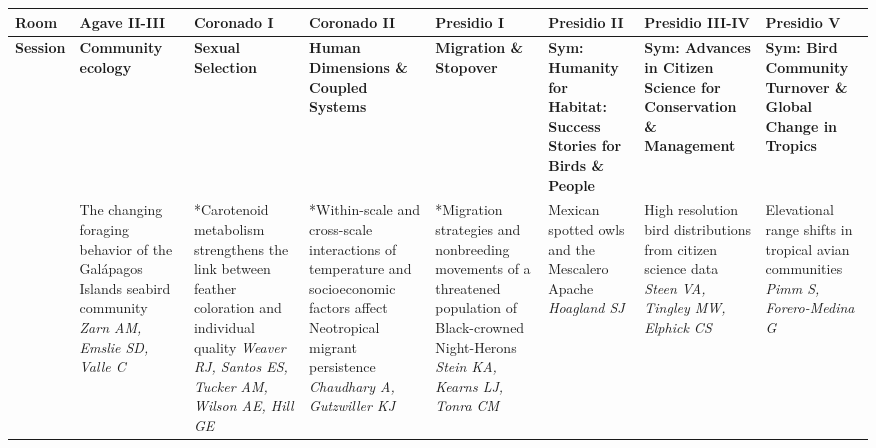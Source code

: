\begin{tabular}{|x{0.85cm}|x{2.85cm}|x{2.85cm}|x{2.85cm}|x{2.85cm}|a{2.85cm}|a{2.85cm}|a{2.85cm}|}\hline
Room & Agave II-III & Coronado I & Coronado II & Presidio I & Presidio II & Presidio III-IV & Presidio V\\
\hline
\rule{0pt}{1em} \textbf{Session} &\footnotesize \textbf{Community ecology} & \footnotesize \textbf{Sexual Selection} & \footnotesize \textbf{Human Dimensions \& Coupled Systems} & \footnotesize \textbf{Migration \& Stopover} & \footnotesize \textbf{Sym: Humanity for Habitat: Success Stories for Birds \& People} & \footnotesize \textbf{Sym: Advances in Citizen Science for Conservation \& Management} & \footnotesize \textbf{Sym: Bird Community Turnover \& Global Change in Tropics}\\
\hline
{}&The changing foraging behavior of the Gal\'{a}pagos Islands seabird community \newline \newline \textit{Zarn AM, Emslie SD, Valle C} & *Carotenoid metabolism strengthens the link between feather coloration and individual quality \newline \newline \textit{Weaver RJ, Santos ES, Tucker AM, Wilson AE, Hill GE} & *Within-scale and cross-scale interactions of temperature and socioeconomic factors affect Neotropical migrant persistence \newline \newline \textit{Chaudhary A, Gutzwiller KJ} & *Migration strategies and nonbreeding movements of a threatened population of Black-crowned Night-Herons \newline \newline \textit{Stein KA, Kearns LJ, Tonra CM} & Mexican spotted owls and the Mescalero Apache \newline \newline \textit{Hoagland SJ} & High resolution bird distributions from citizen science data \newline \newline \textit{Steen VA, Tingley MW, Elphick CS} & Elevational range shifts in tropical avian communities \newline \newline \textit{Pimm S, Forero-Medina G}\\
\hline

\end{tabular}
